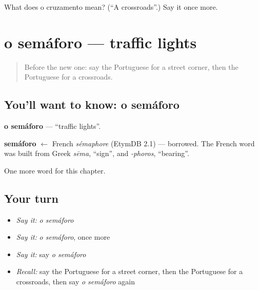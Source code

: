 \begin{tcolorbox}[breakable,colback=teal!4,colframe=teal!35!black,title={Before you move on}]
What does o cruzamento mean? (\textquotedblleft{}A crossroads\textquotedblright{}.) Say it once more.
\end{tcolorbox}
\section[o semáforo]{o semáforo — traffic lights}

\label{lesson:PT-C87-semaforo}



\begin{quote}
Before the new one: say the Portuguese for a street corner, then the Portuguese for a crossroads.
\end{quote}

\subsection*{You'll want to know: o semáforo}
\textbf{o semáforo} — \textquotedblleft{}traffic lights\textquotedblright{}.

\begin{cousinweb}
\textbf{semáforo} $\leftarrow$ French \emph{sémaphore} (EtymDB 2.1) — borrowed. The French word was built from Greek \emph{sēma}, \textquotedblleft{}sign\textquotedblright{}, and \emph{-phoros}, \textquotedblleft{}bearing\textquotedblright{}.
\end{cousinweb}

\begin{grammarlens}[title={What you've built}]
One more word for this chapter.
\end{grammarlens}

\subsection*{Your turn}
\begin{itemize}
\raggedright
  \item \emph{Say it:} \emph{o semáforo}
  \item \emph{Say it:} \emph{o semáforo}, once more
  \item \emph{Say it:} say \emph{o semáforo}
  \item \emph{Recall:} say the Portuguese for a street corner, then the Portuguese for a crossroads, then say \emph{o semáforo} again
\end{itemize}

